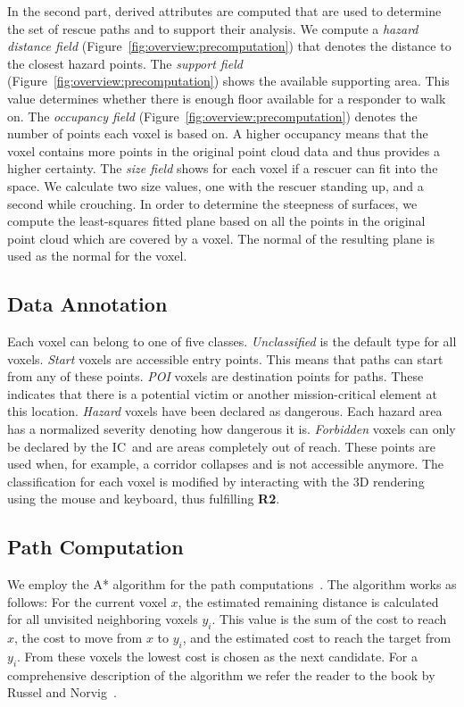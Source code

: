 \documentclass{egpubl}
\def\IC{IC}
\begin{document}
 In the second part, derived attributes are computed that are used to determine the set of rescue paths and to support their analysis. We compute a \emph{hazard distance field} (Figure~\ref{fig:overview:precomputation}) that denotes the distance to the closest hazard points. The \emph{support field} (Figure~\ref{fig:overview:precomputation}) shows the available supporting area. This value determines whether there is enough floor available for a responder to walk on. The \emph{occupancy field} (Figure~\ref{fig:overview:precomputation}) denotes the number of points each voxel is based on. A higher occupancy means that the voxel contains more points in the original point cloud data and thus provides a higher certainty. The \emph{size field} shows for each voxel if a rescuer can fit into the space. We calculate two size values, one with the rescuer standing up, and a second while crouching. In order to determine the steepness of surfaces, we compute the least-squares fitted plane based on all the points in the original point cloud which are covered by a voxel. The normal of the resulting plane is used as the normal for the voxel.

\subsection{Data Annotation} \label{sec:overview:annotation}
Each voxel can belong to one of five classes. \emph{Unclassified} is the default type for all voxels. \emph{Start} voxels are accessible entry points. This means that paths can start from any of these points. \emph{POI} voxels are destination points for paths. These indicates that there is a potential victim or another mission-critical element at this location. \emph{Hazard} voxels have been declared as dangerous. Each hazard area has a normalized severity denoting how dangerous it is. \emph{Forbidden} voxels can only be declared by the \IC\ and are areas completely out of reach. These points are used when, for example, a corridor collapses and is not accessible anymore. The classification for each voxel is modified by interacting with the 3D rendering using the mouse and keyboard, thus fulfilling {\bfseries R2}. 

\subsection{Path Computation} \label{sec:overview:pathcomputation}
We employ the A* algorithm for the path computations~\cite{4082128}. The algorithm works as follows: For the current voxel $x$, the estimated remaining distance is calculated for all unvisited neighboring voxels $y_i$. This value is the sum of the cost to reach $x$, the cost to move from $x$ to $y_i$, and the estimated cost to reach the target from $y_i$. From these voxels the lowest cost is chosen as the next candidate. For a comprehensive description of the algorithm we refer the reader to the book by Russel and Norvig~\cite{AStar}.
\end{document}

